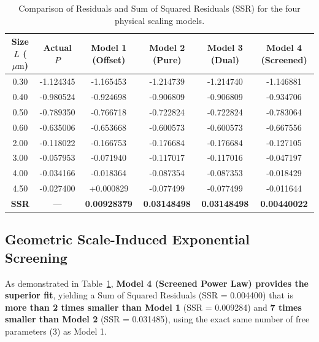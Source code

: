 \documentclass[12pt,letterpaper]{article}
\begin{document}
\begin{table}[htbp]
\centering
\caption{Comparison of Residuals and Sum of Squared Residuals (SSR) for the four physical scaling models.}
\label{tab:fit_comparison}
\begin{tabular}{@{}cccccc@{}}
\toprule
\textbf{Size $L$ ($\mu\text{m}$)} & \textbf{Actual $P$} & \textbf{Model 1 (Offset)} & \textbf{Model 2 (Pure)} & \textbf{Model 3 (Dual)} & \textbf{Model 4 (Screened)} \\
\midrule
0.30 & -1.124345 & -1.165453 & -1.214739 & -1.214740 & -1.146881 \\
0.40 & -0.980524 & -0.924698 & -0.906809 & -0.906809 & -0.934706 \\
0.50 & -0.789350 & -0.766718 & -0.722824 & -0.722824 & -0.783064 \\
0.60 & -0.635006 & -0.653668 & -0.600573 & -0.600573 & -0.667556 \\
2.00 & -0.118022 & -0.166753 & -0.176684 & -0.176684 & -0.127105 \\
3.00 & -0.057953 & -0.071940 & -0.117017 & -0.117016 & -0.047197 \\
4.00 & -0.034166 & -0.018364 & -0.087354 & -0.087353 & -0.018429 \\
4.50 & -0.027400 & +0.000829 & -0.077499 & -0.077499 & -0.011644 \\
\midrule
\textbf{SSR} & --- & \textbf{0.00928379} & \textbf{0.03148498} & \textbf{0.03148498} & \textbf{0.00440022} \\
\bottomrule
\end{tabular}
\end{table}

\subsection{Geometric Scale-Induced Exponential Screening}
As demonstrated in Table~\ref{tab:fit_comparison}, \textbf{Model 4 (Screened Power Law) provides the superior fit}, yielding a Sum of Squared Residuals (SSR = 0.004400) that is \textbf{more than 2 times smaller than Model 1} (SSR = 0.009284) and \textbf{7 times smaller than Model 2} (SSR = 0.031485), using the exact same number of free parameters (3) as Model 1.
\end{document}
